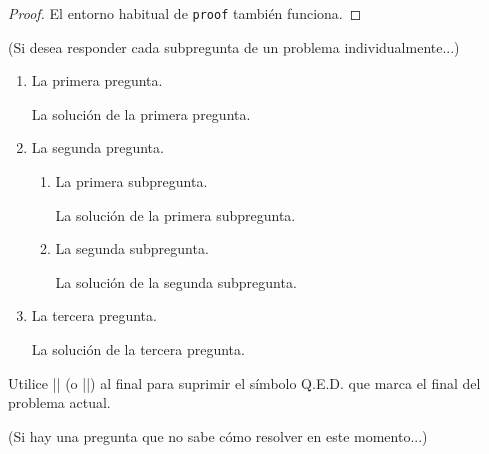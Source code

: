 \documentclass[11pt,
  logo = {example-image},
  title in boldface,
  theorem in new line,
]{homework}
\begin{document}
\begin{proof}
    El entorno habitual de \verb|proof| también funciona.
\end{proof}


\bigskip\textcolor{gray!55}{(Si desea responder cada subpregunta de un problema individualmente...)}

\begin{problem}
    \begin{enumerate}[itemsep=.5\baselineskip]
        \item La primera pregunta.

        \begin{solution}
            La solución de la primera pregunta.
        \end{solution}

        \item La segunda pregunta.

        \begin{enumerate}[itemsep=.3\baselineskip]
            \item La primera subpregunta.

            \begin{solution}
                La solución de la primera subpregunta.
            \end{solution}

            \item La segunda subpregunta.

            \begin{solution}
                La solución de la segunda subpregunta.
            \end{solution}

        \end{enumerate}

        \item La tercera pregunta.

        \begin{solution}
            La solución de la tercera pregunta.
        \end{solution}

    \end{enumerate}
    Utilice \cverb|\noqed| (o \cverb|\noQED|) al final para suprimir el símbolo Q.E.D. que marca el final del problema actual.
    \noQED
\end{problem}


\bigskip\textcolor{gray!55}{(Si hay una pregunta que no sabe cómo resolver en este momento...)}

\end{document}
